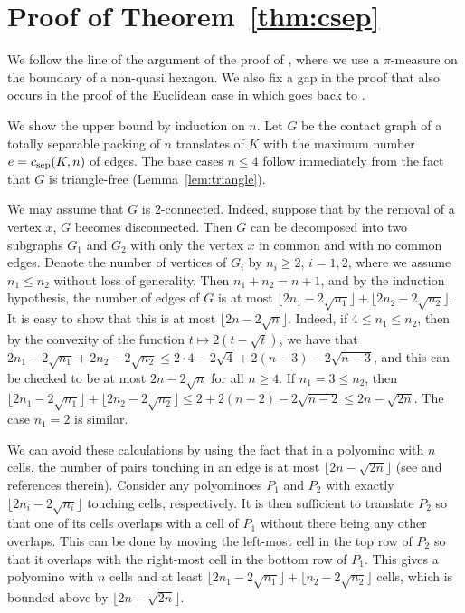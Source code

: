 \documentclass[a4paper,12pt]{article}
\theoremstyle{plain}
\theoremstyle{definition}
\newcommand{\csep}{c_{\textnormal{sep}}} %
\begin{document}
\section{Proof of Theorem~\ref{thm:csep}}\label{sec:csep}

We follow the 
line of the argument of the proof of \cite[Theorem~13]{BKO}, where we use a $\pi$-measure on the boundary of a non-quasi hexagon.
We also fix a gap in the proof that also occurs in the proof of the Euclidean case in \cite{BSS16} which goes back to \cite{H74}.

We show the upper bound by induction on $n$. Let $G$ be the contact graph of a totally 
separable packing of $n$ translates of $K$ with the maximum number $e=\csep(K,n)$ of 
edges.
The base cases $n\leq4$ follow immediately from the fact that $G$ is 
triangle-free (Lemma~\ref{lem:triangle}).

We may assume that $G$ is $2$-connected.
Indeed, suppose that by the removal of a 
vertex $x$, $G$ becomes disconnected.
Then $G$ can be decomposed into two subgraphs $G_1$ and $G_2$ with only the vertex $x$ in common and with no common edges.
Denote the number of vertices of $G_i$ by $n_i\geq 2$, $i=1,2$, where we assume $n_1\leq n_2$ without loss of generality.
Then $n_1+n_2=n+1$, and by the induction hypothesis, the number of edges of $G$ is at most $\lfloor 2n_1-2\sqrt{n_1}\rfloor+\lfloor 2n_2-2\sqrt{n_2}\rfloor$.
It is easy to show that this is at most $\lfloor 2n-2\sqrt{n}\rfloor$.
Indeed, if $4\leq n_1\leq n_2$, then by the convexity of the function $t\mapsto 2(t-\sqrt{t})$, we have that $2n_1-2\sqrt{n_1}+2n_2-2\sqrt{n_2}\leq 2\cdot 4-2\sqrt{4} + 2(n-3)-2\sqrt{n-3}$, and this can be checked to be at most $2n-2\sqrt{n}$ for all $n\geq 4$.
If $n_1=3\leq n_2$, then $\lfloor 2n_1-2\sqrt{n_1}\rfloor+\lfloor 2n_2-2\sqrt{n_2}\rfloor \leq 2 + 2(n-2)-2\sqrt{n-2}\leq 2n-\sqrt{2n}$.
The case $n_1=2$ is similar.

We can avoid these calculations by using the fact that in a polyomino with $n$ cells, the number of pairs touching in an edge is at most $\lfloor 2n-\sqrt{2n}\rfloor$ (see \cite{BKO} and references therein).
Consider any polyominoes $P_1$ and $P_2$ with exactly $\lfloor 2n_i-2\sqrt{n_i}\rfloor$ touching cells, respectively.
It is then sufficient to translate $P_2$ so that one of its cells overlaps with a cell of $P_1$ without there being any other overlaps.
This can be done by moving the left-most cell in the top row of $P_2$ so that it overlaps with the right-most cell in the bottom row of $P_1$.
This gives a polyomino with $n$ cells and at least $\lfloor 2n_1-2\sqrt{n_1}\rfloor+\lfloor n_2-2\sqrt{n_2}\rfloor$ cells, which is bounded above by $\lfloor 2n-\sqrt{2n}\rfloor$.
\end{document}

